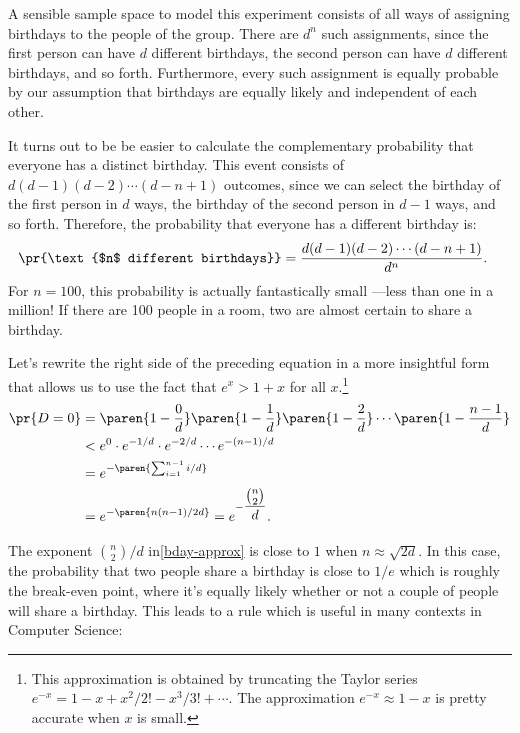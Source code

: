 A sensible sample space to model this experiment consists of all ways of
assigning birthdays to the people of the group.  There are $d^n$ such
assignments, since the first person can have $d$ different birthdays, the
second person can have $d$ different birthdays, and so forth.
Furthermore, every such assignment is equally probable by our assumption
that birthdays are equally likely and independent of each other.

It turns out to be be easier to calculate the complementary probability
that everyone has a distinct birthday.  This event consists of $d (d - 1)
(d - 2) \cdots (d - n + 1)$ outcomes, since we can select the birthday of
the first person in $d$ ways, the birthday of the second person in $d - 1$
ways, and so forth.  Therefore, the probability that everyone has a
different birthday is:
\begin{align*}
\pr{\text{$n$ different birthdays}} & = \frac{d (d - 1) (d - 2) \cdots (d - n + 1)}{d^n}.
\end{align*}
For $n=100$, this probability is actually fantastically small ---less
than one in a million!  If there are 100 people in a room, two are
almost certain to share a birthday.

Let's rewrite the right side of the preceding equation in a more
insightful form that allows us to use the fact that $e^x >1+x$ for all
$x$.\footnote{This approximation is obtained by truncating the Taylor
series $e^{-x} = 1 - x + x^2/2! - x^3/3! + \cdots$.  The approximation
$e^{-x} \approx 1 - x$ is pretty accurate when $x$ is small.}
\begin{align}
\pr{D=0} & = \paren{1 - \frac{0}{d}}
             \paren{1 - \frac{1}{d}}
             \paren{1 - \frac{2}{d}}
             \cdots
             \paren{1 - \frac{n - 1}{d}}\notag\\
       & < e^0 \cdot e^{-1/d} \cdot e^{-2/d} \cdots e^{-(n-1)/d} \notag\\
       & = e^{-\paren{\sum_{i=1}^{n-1} i/d}}\notag\\
       & = e^{-\paren{n(n-1)/2d}} = e^{-\dfrac{\binom{n}{2}}{d}}.\label{bday-approx}
\end{align}

The exponent $\binom{n}{2}/d$ in\eqref{bday-approx} is close to $1$ when
$n \approx \sqrt{2d}$.  In this case, the probability that two people
share a birthday is close to $1/e$ which is roughly the break-even point,
where it's equally likely whether or not a couple of people will share a
birthday.  This leads to a rule which is useful in many contexts in
Computer Science:


